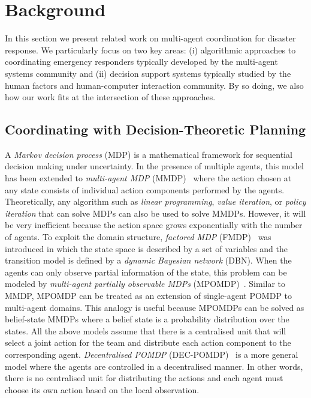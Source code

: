 \section{Background}
In this section we present related work on multi-agent coordination for disaster response. We particularly focus on two key areas: (i) algorithmic approaches to coordinating emergency responders typically developed by the multi-agent systems community and (ii) decision support systems typically studied by the human factors and human-computer interaction community. By so doing, we also how our work fits at the intersection of these approaches.
\subsection{Coordinating with Decision-Theoretic Planning}

A {\em Markov decision process} (MDP) is a mathematical framework
for sequential decision making under uncertainty. In the presence
of multiple agents, this model has been extended to {\em
multi-agent MDP} (MMDP)~\cite{boutilier1996planning} where the
action chosen at any state consists of individual action components
performed by the agents. Theoretically, any algorithm such as {\em
linear programming}, {\em value iteration}, or {\em policy
iteration} that can solve MDPs can also be used to solve MMDPs.
However, it will be very inefficient because the action space grows
exponentially with the number of agents. To exploit the domain
structure, {\em factored MDP} (FMDP)~\cite{boutilier2000stochastic}
was introduced in which the state space is described by a set of
variables and the transition model is defined by a {\em dynamic
Bayesian network} (DBN). When the agents can only observe partial
information of the state, this problem can be modeled by {\em
multi-agent partially observable MDPs}
(MPOMDP)~\cite{pynadath2002communicative}. Similar to MMDP, MPOMDP
can be treated as an extension of single-agent POMDP to multi-agent
domains. This analogy is useful because MPOMDPs can be solved as
belief-state MMDPs where a belief state is a probability
distribution over the states. All the above models assume that
there is a centralised unit that will select a joint action for the
team and distribute each action component to the corresponding
agent. {\em Decentralised POMDP}
(DEC-POMDP)~\cite{bernstein2002complexity} is a more general model
where the agents are controlled in a decentralised manner. In other
words, there is no centralised unit for distributing the actions
and each agent must choose its own action based on the local
observation.

